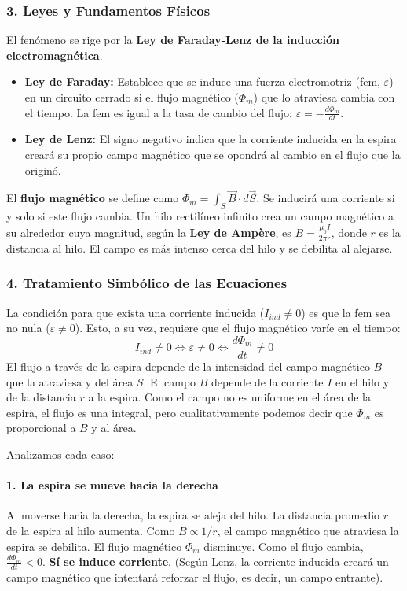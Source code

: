 \subsubsection*{3. Leyes y Fundamentos Físicos}
El fenómeno se rige por la \textbf{Ley de Faraday-Lenz de la inducción electromagnética}.
\begin{itemize}
    \item \textbf{Ley de Faraday:} Establece que se induce una fuerza electromotriz (fem, $\varepsilon$) en un circuito cerrado si el flujo magnético ($\Phi_m$) que lo atraviesa cambia con el tiempo. La fem es igual a la tasa de cambio del flujo: $\varepsilon = -\frac{d\Phi_m}{dt}$.
    \item \textbf{Ley de Lenz:} El signo negativo indica que la corriente inducida en la espira creará su propio campo magnético que se opondrá al cambio en el flujo que la originó.
\end{itemize}
El \textbf{flujo magnético} se define como $\Phi_m = \int_S \vec{B} \cdot d\vec{S}$. Se inducirá una corriente si y solo si este flujo cambia.
Un hilo rectilíneo infinito crea un campo magnético a su alrededor cuya magnitud, según la \textbf{Ley de Ampère}, es $B = \frac{\mu_0 I}{2\pi r}$, donde $r$ es la distancia al hilo. El campo es más intenso cerca del hilo y se debilita al alejarse.

\subsubsection*{4. Tratamiento Simbólico de las Ecuaciones}
La condición para que exista una corriente inducida ($I_{ind} \neq 0$) es que la fem sea no nula ($\varepsilon \neq 0$). Esto, a su vez, requiere que el flujo magnético varíe en el tiempo:
$$I_{ind} \neq 0 \iff \varepsilon \neq 0 \iff \frac{d\Phi_m}{dt} \neq 0$$
El flujo a través de la espira depende de la intensidad del campo magnético $B$ que la atraviesa y del área $S$. El campo $B$ depende de la corriente $I$ en el hilo y de la distancia $r$ a la espira. Como el campo no es uniforme en el área de la espira, el flujo es una integral, pero cualitativamente podemos decir que $\Phi_m$ es proporcional a $B$ y al área.

Analizamos cada caso:
\paragraph*{1. La espira se mueve hacia la derecha}
Al moverse hacia la derecha, la espira se aleja del hilo. La distancia promedio $r$ de la espira al hilo aumenta. Como $B \propto 1/r$, el campo magnético que atraviesa la espira se debilita. El flujo magnético $\Phi_m$ disminuye. Como el flujo cambia, $\frac{d\Phi_m}{dt} < 0$. \textbf{Sí se induce corriente}. (Según Lenz, la corriente inducida creará un campo magnético que intentará reforzar el flujo, es decir, un campo entrante).

